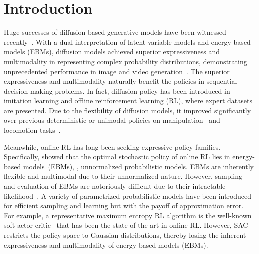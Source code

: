 \section{Introduction}
Huge successes of diffusion-based generative models have been witnessed recently~\cite{sohl-dickstein2015deep,song2019generative,ho2020denoising}. With a dual interpretation of latent variable models and energy-based models (EBMs), diffusion models achieved superior expressiveness and multimodality in representing complex probability distributions, demonstrating unprecedented performance in image and video generation~\cite{ramesh2021zero,saharia2022photorealistic}. The superior expressiveness and multimodality naturally benefit the policies in sequential decision-making problems. In fact, diffusion policy has been introduced in imitation learning and offline reinforcement learning (RL), where expert datasets are presented. Due to the flexibility of diffusion models, it improved significantly over previous deterministic or unimodal policies on manipulation~\cite{chi2023diffusion,ke20243d,scheikl2024movement} and locomotion tasks~\cite{huang2024diffuseloco}.



Meanwhile, online RL has long been seeking expressive policy families.
Specifically, \citet{haarnoja2017reinforcement} showed that the optimal stochastic policy of online RL lies in energy-based models~(EBMs), \ie, unnormalized probabilistic models. EBMs are inherently flexible and multimodal due to their unnormalized nature.
However, sampling and evaluation of EBMs are notoriously difficult due to their intractable likelihood~\cite{song2021train}. A variety of parametrized probabilistic models have been introduced for efficient sampling and learning but with the payoff of approximation error. 
For example, a representative maximum entropy RL algorithm is the well-known soft actor-critic~\citep[SAC, ][]{haarnoja2018soft} that has been the state-of-the-art in online RL. However, SAC restricts the policy space to Gaussian distributions, thereby losing the inherent expressiveness and multimodality of energy-based models (EBMs).

